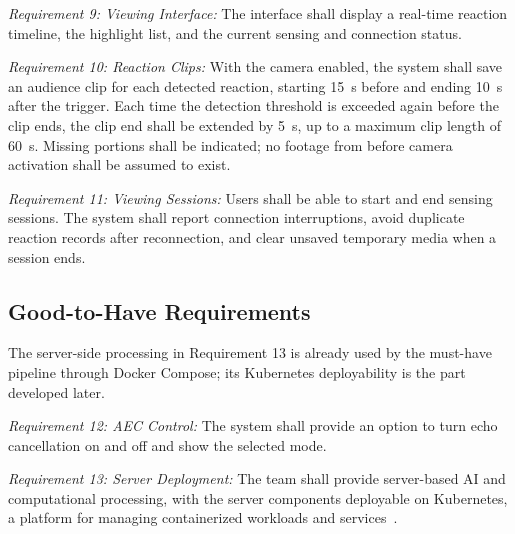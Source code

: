 \noindent\textit{Requirement 9: Viewing Interface:} The interface shall display a real-time reaction timeline, the highlight list, and the current sensing and connection status.

\noindent\textit{Requirement 10: Reaction Clips:} With the camera enabled, the system shall save an audience clip for each detected reaction, starting 15~s before and ending 10~s after the trigger. Each time the detection threshold is exceeded again before the clip ends, the clip end shall be extended by 5~s, up to a maximum clip length of 60~s. Missing portions shall be indicated; no footage from before camera activation shall be assumed to exist.

\noindent\textit{Requirement 11: Viewing Sessions:} Users shall be able to start and end sensing sessions. The system shall report connection interruptions, avoid duplicate reaction records after reconnection, and clear unsaved temporary media when a session ends.


\subsection{Good-to-Have Requirements}
The server-side processing in Requirement 13 is already used by the must-have pipeline through Docker Compose; its Kubernetes deployability is the part developed later.

\noindent\textit{Requirement 12: AEC Control:} The system shall provide an option to turn echo cancellation on and off and show the selected mode.

\noindent\textit{Requirement 13: Server Deployment:} The team shall provide server-based AI and computational processing, with the server components deployable on Kubernetes, a platform for managing containerized workloads and services~\cite{kubernetes}.

